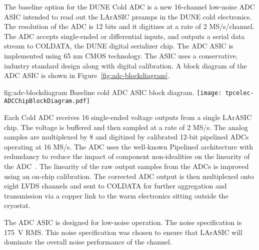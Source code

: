 The baseline option for the DUNE Cold ADC is a new 16-channel low-noise ADC ASIC intended to read out the LArASIC preamps in the DUNE cold electronics. The resolution of the ADC is 12 bits and it digitizes at a rate of 2 MS/s/channel. The ADC accepts single-ended or differential inputs, and outputs a serial data stream to COLDATA, the DUNE digital serializer chip. The ADC ASIC is implemented using 65 nm CMOS technology. The ASIC uses a conservative, industry standard design along with digital calibration. A block diagram of the ADC ASIC is shown in Figure~\ref{fig:adc-blockdiagram}.

\begin{dunefigure}
{fig:adc-blockdiagram}
{Baseline cold ADC ASIC block diagram.}
\texttt{[image: tpcelec-ADCChipBlockDiagram.pdf]}
\end{dunefigure}

Each Cold ADC receives 16 single-ended voltage outputs from a single LArASIC chip. The voltage is buffered and then sampled at a rate of 2 MS/s. The analog samples are multiplexed by 8 and digitized by calibrated 12-bit pipelined ADCs operating at 16 MS/s. The ADC uses the well-known Pipelined architecture with redundancy to reduce the impact of component non-idealities on the linearity of the ADC~\cite{121557}. The linearity of the raw output samples from the ADCs is improved using an on-chip calibration. The corrected ADC output is then multiplexed onto eight LVDS channels and sent to COLDATA for further aggregation and transmission via a copper link to the warm electronics sitting outside the cryostat.

The ADC ASIC is designed for low-noise operation. The noise specification is 175~\si{\micro}V RMS. This noise specification was chosen to ensure that LArASIC will dominate the overall noise performance of the channel.

